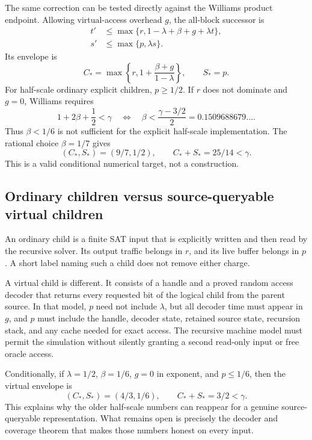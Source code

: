 \documentclass[11pt]{article}
\begin{document}
The same correction can be tested directly against the Williams product
endpoint.  Allowing virtual-access overhead $g$, the all-block successor is
\begin{align}
 t'&\leq\max\{r,1-\lambda+\beta+g+\lambda t\},\label{eq:routeBtime}\\
 s'&\leq\max\{p,\lambda s\}.
\end{align}
Its envelope is
\begin{equation}
 C_* = \max\left\{r,1+\frac{\beta+g}{1-\lambda}\right\},
 \qquad S_*=p.\label{eq:routeBfixed}
\end{equation}
For half-scale ordinary explicit children, $p\geq1/2$.  If $r$ does not
dominate and $g=0$, Williams requires
\[
 1+2\beta+\frac12<\gamma
 \quad\Longleftrightarrow\quad
 \boxed{\beta<\frac{\gamma-3/2}{2}=0.1509688679\ldots.}
\]
Thus $\beta<1/6$ is not sufficient for the explicit half-scale implementation.
The rational choice $\beta=1/7$ gives
\[
 (C_*,S_*)=(9/7,1/2),\qquad C_*+S_*=25/14<\gamma.
\]
This is a valid conditional numerical target, not a construction.

\subsection{Ordinary children versus source-queryable virtual children}

An ordinary child is a finite SAT input that is explicitly written and then
read by the recursive solver.  Its output traffic belongs in $r$, and its live
buffer belongs in $p$.  A short label naming such a child does not remove
either charge.

A virtual child is different.  It consists of a handle and a proved random
access decoder that returns every requested bit of the logical child from the
parent source.  In that model, $p$ need not include $\lambda$, but all decoder
time must appear in $g$, and $p$ must include the handle, decoder state,
retained source state, recursion stack, and any cache needed for exact access.
The recursive machine model must permit the simulation without silently
granting a second read-only input or free oracle access.

Conditionally, if $\lambda=1/2$, $\beta=1/6$, $g=0$ in exponent, and
$p\leq1/6$, then the virtual envelope is
\[
 (C_*,S_*)=(4/3,1/6),\qquad C_*+S_*=3/2<\gamma.
\]
This explains why the older half-scale numbers can reappear for a genuine
source-queryable representation.  What remains open is precisely the decoder
and coverage theorem that makes those numbers honest on every input.
\end{document}
